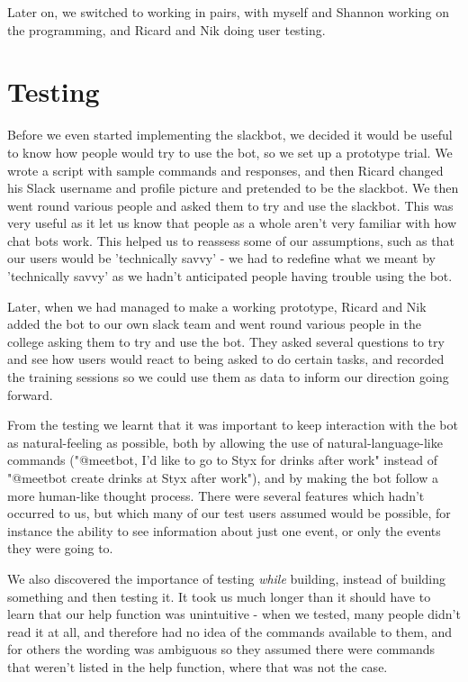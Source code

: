 \documentclass{report}
\begin{document}
Later on, we switched to working in pairs, with myself and Shannon working on the programming, and Ricard and Nik doing user testing.

\section{Testing}
Before we even started implementing the slackbot, we decided it would be useful to know how people would try to use the bot, so we set up a prototype trial. We wrote a script with sample commands and responses, and then Ricard changed his Slack username and profile picture and pretended to be the slackbot. We then went round various people and asked them to try and use the slackbot. This was very useful as it let us know that people as a whole aren't very familiar with how chat bots work. This helped us to reassess some of our assumptions, such as that our users would be 'technically savvy' - we had to redefine what we meant by 'technically savvy' as we hadn't anticipated people having trouble using the bot.

Later, when we had managed to make a working prototype, Ricard and Nik added the bot to our own slack team and went round various people in the college asking them to try and use the bot. They asked several questions to try and see how users would react to being asked to do certain tasks, and recorded the training sessions so we could use them as data to inform our direction going forward.

From the testing we learnt that it was important to keep interaction with the bot as natural-feeling as possible, both by allowing the use of natural-language-like commands ("@meetbot, I'd like to go to Styx for drinks after work" instead of "@meetbot create drinks at Styx after work"), and by making the bot follow a more human-like thought process. There were several features which hadn't occurred to us, but which many of our test users assumed would be possible, for instance the ability to see information about just one event, or only the events they were going to.

We also discovered the importance of testing \emph{while} building, instead of building something and then testing it. It took us much longer than it should have to learn that our help function was unintuitive - when we tested, many people didn't read it at all, and therefore had no idea of the commands available to them, and for others the wording was ambiguous so they assumed there were commands that weren't listed in the help function, where that was not the case.
\end{document}
